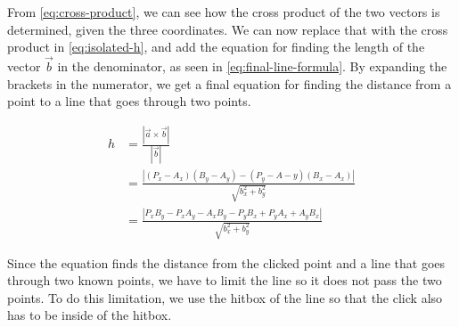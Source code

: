 From \eqref{eq:cross-product}, we can see how the cross product of the two vectors is determined, given the three coordinates.
We can now replace that with the cross product in \eqref{eq:isolated-h}, and add the equation for finding the length of the vector $\vec{b}$ in the denominator, as seen in \eqref{eq:final-line-formula}.
By expanding the brackets in the numerator, we get a final equation for finding the distance from a point to a line that goes through two points.

\begin{equation}\label{eq:final-line-formula}
\begin{aligned}
	h &= \frac{|\vec{a} \times \vec{b}|}{|\vec{b}|}\\
	  &= \frac{|(P_x-A_x)(B_y-A_y)-(P_y-A-y)(B_x-A_x)|}{\sqrt{b_x^2+b_y^2}}\\
	  &= \frac{|P_xB_y-P_xA_y-A_xB_y-P_yB_x+P_yA_x+A_yB_x|}{\sqrt{b_x^2+b_y^2}}
\end{aligned}
\end{equation}

Since the equation finds the distance from the clicked point and a line that goes through two known points, we have to limit the line so it does not pass the two points.
To do this limitation, we use the hitbox of the line so that the click also has to be inside of the hitbox.